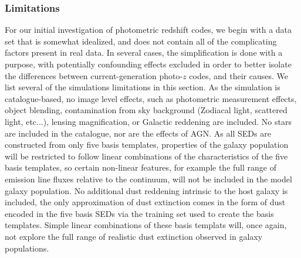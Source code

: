 \subsubsection{Limitations}
\label{sec:buzzlimitations}
For our initial investigation of photometric redshift codes, we begin with a data set that is somewhat idealized, and does not contain all of the complicating factors present in real data.  In several cases, the simplification is done with a purpose, with potentially confounding effects excluded in order to better isolate the differences between current-generation photo-$z$ codes, and their causes.  We list several of the simulations limitations in this section.
As the simulation is catalogue-based, no image level effects, such as photometric measurement effects, object blending, contamination from sky background (Zodiacal light, scattered light, etc...), lensing magnification, or Galactic reddening are included.  No stars are included in the catalogue, nor are the effects of AGN.
As all SEDs are constructed from only five basis templates, properties of the galaxy population will be restricted to follow linear combinations of the characteristics of the five basis templates, so certain non-linear features, for example the full range of emission line fluxes relative to the continuum, will not be included in the model galaxy population.  No additional dust reddening intrinsic to the host galaxy is included, the only approximation of dust extinction comes in the form of dust encoded in the five basis SEDs via the training set used to create the basis templates.  Simple linear combinations of these basis templats will, once again, not explore the full range of realistic dust extinction observed in galaxy populations.

